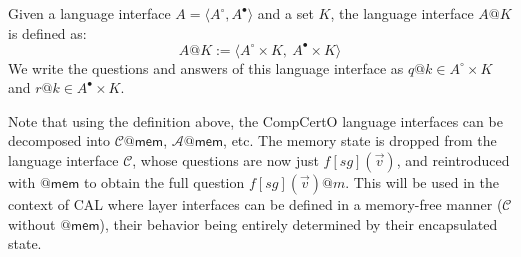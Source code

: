 \documentclass[acmsmall,screen,review,anonymous]{acmart}
\newcommand{\kw}[1]{\ensuremath{ \mathsf{#1} }}
\newcommand{\que}{\circ}
\newcommand{\ans}{\bullet}
\begin{document}
\begin{definition}
Given a language interface $A = \langle A^\que, A^\ans \rangle$
and a set $K$,
the language interface $A@K$ is defined as:
\[
  A@K := \langle A^\que \times K ,\: A^\ans \times K \rangle
\]
We write the questions and answers of this language interface as
$q@k \in A^\que \times K$ and
$r@k \in A^\ans \times K$.
\end{definition}

Note that using the definition above,
the CompCertO language interfaces
can be decomposed into $\mathcal{C}@\kw{mem}$, $\mathcal{A}@\kw{mem}$, etc.
The memory state is dropped from the language interface $\mathcal{C}$,
whose questions are now just $f[\mathit{sg}](\vec{v})$,
and reintroduced with $@\kw{mem}$ to obtain
the full question $f[\mathit{sg}](\vec{v})@m$.
This will be used in the context of CAL
where layer interfaces can be defined in a memory-free manner
($\mathcal{C}$ without $@\kw{mem}$),
their behavior being entirely determined by their encapsulated state.
\end{document}
